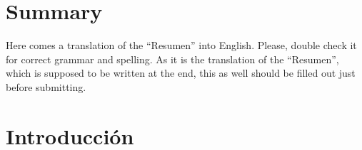 \documentclass[a4paper, 12pt]{book}
\begin{document}




\chapter*{Summary}

Here comes a translation of the ``Resumen'' into English. 
Please, double check it for correct grammar and spelling.
As it is the translation of the ``Resumen'', which is supposed to be written at the end, this as well should be filled out just before submitting.




\tableofcontents 
\cleardoublepage
\listoffigures %



\cleardoublepage
\chapter{Introducción}
\label{chap:introducción}
\label{sec:intro} %
\end{document}
